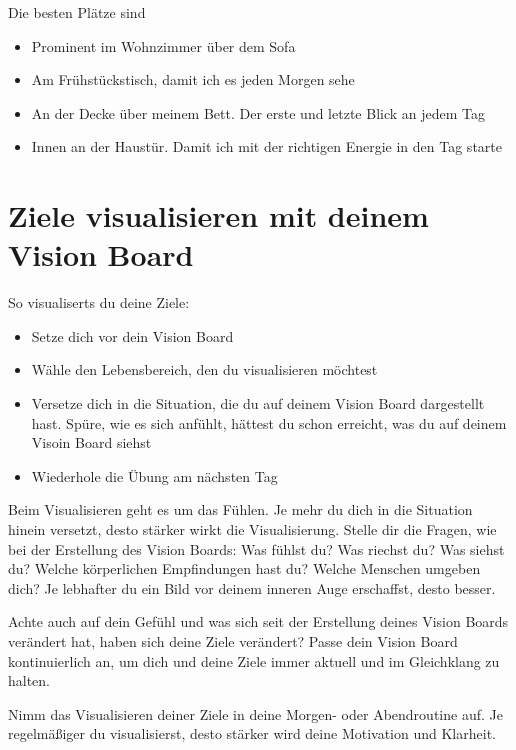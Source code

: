 \documentclass[../Lebensziel.tex]{subfiles}
\begin{document}
Die besten Plätze sind
\begin{itemize}
    \item Prominent im Wohnzimmer über dem Sofa
    \item Am Frühstückstisch, damit ich es jeden Morgen sehe
    \item An der Decke über meinem Bett. Der erste und letzte Blick an jedem Tag
    \item Innen an der Haustür. Damit ich mit der richtigen Energie in den Tag starte
\end{itemize}

\section{Ziele visualisieren mit deinem Vision Board}
So visualiserts du deine Ziele:
\begin{itemize}
    \item Setze dich vor dein Vision Board
    \item Wähle den Lebensbereich, den du visualisieren möchtest
    \item Versetze dich in die Situation, die du auf deinem Vision Board dargestellt hast. Spüre, wie es sich anfühlt, hättest du schon erreicht, was du auf deinem Visoin Board siehst
    \item Wiederhole die Übung am nächsten Tag
\end{itemize}

Beim Visualisieren geht es um das Fühlen. Je mehr du dich in die Situation hinein versetzt, desto stärker wirkt die Visualisierung. Stelle dir die Fragen, wie bei der Erstellung des Vision Boards: Was fühlst du? Was riechst du? Was siehst du? Welche körperlichen Empfindungen hast du? Welche Menschen umgeben dich? Je lebhafter du ein Bild vor deinem inneren Auge erschaffst, desto besser. 

Achte auch auf dein Gefühl und was sich seit der Erstellung deines Vision Boards verändert hat, haben sich deine Ziele verändert? Passe dein Vision Board kontinuierlich an, um dich und deine Ziele immer aktuell und im Gleichklang zu halten.

Nimm das Visualisieren deiner Ziele in deine Morgen- oder Abendroutine auf. Je regelmäßiger du visualisierst, desto stärker wird deine Motivation und Klarheit.
\end{document}
